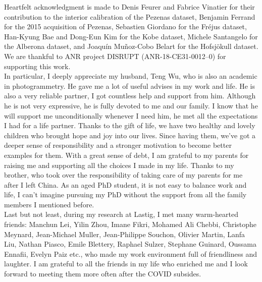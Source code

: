 \documentclass[a4paper,11pt,twoside]{ThesisStyle}
\begin{document}
Heartfelt acknowledgment is made to Denis Feurer and Fabrice Vinatier for their contribution to the interior calibration of the Pezenas dataset, Benjamin Ferrand for the 2015 acquisition of Pezenas, Sebastien Giordano for the Fr{\'e}jus dataset, Han-Kyung Bae and Dong-Eun Kim for the Kobe dataset, Michele Santangelo for the Alberona dataset, and Joaquín Muñoz-Cobo Belart for the Hofsjökull dataset. We are thankful to ANR project DISRUPT (ANR-18-CE31-0012–0) for supporting this work.\\

In particular, I deeply appreciate my husband, Teng Wu, who is also an academic in photogrammetry. He gave me a lot of useful advises in my work and life. He is also a very reliable partner, I got countless help and support from him. Although he is not very expressive, he is fully devoted to me and our family. I know that he will support me unconditionally whenever I need him, he met all the expectations I had for a life partner. Thanks to the gift of life, we have two healthy and lovely children who brought hope and joy into our lives. Since having them, we've got a deeper sense of responsibility and a stronger motivation to become better examples for them. With a great sense of debt, I am grateful to my parents for raising me and supporting all the choices I made in my life. Thanks to my brother, who took over the responsibility of taking care of my parents for me after I left China. As an aged PhD student, it is not easy to balance work and life, I can't imagine pursuing my PhD without the support from all the family members I mentioned before.\\

Last but not least, during my research at Lastig, I met many warm-hearted friends: Manchun Lei, Yilin Zhou, Imane Fikri, Mohamed Ali Chebbi, Christophe Meynard, Jean-Michael Muller, Jean-Philippe Souchon, Olivier Martin, Lanfa Liu, Nathan Piasco, Emile Blettery, Raphael Sulzer, Stephane Guinard, Oussama Ennafii, Evelyn Paiz etc., who made my work environment full of friendliness and laughter. I am grateful to all the friends in my life who enriched me and I look forward to meeting them more often after the COVID subsides.\\



\dominitoc
\tableofcontents
\cleardoublepage


\mainmatter
\cleardoublepage

\cleardoublepage

\cleardoublepage

\cleardoublepage

\cleardoublepage

\cleardoublepage

\cleardoublepage

\end{document}
